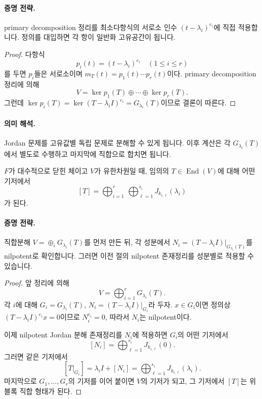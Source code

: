 \paragraph{증명 전략.}
primary decomposition 정리를 최소다항식의 서로소 인수 $(t-\lambda_i)^{e_i}$에 직접 적용합니다. 정의를 대입하면 각 항이 일반화 고유공간이 됩니다.

\begin{proof}
다항식
$$
p_i(t)=(t-\lambda_i)^{e_i}\quad(1\le i\le r)
$$
를 두면 $p_i$들은 서로소이며 $m_T(t)=p_1(t)\cdots p_r(t)$이다. primary decomposition 정리에 의해
$$
V=\ker p_1(T)\oplus\cdots\oplus\ker p_r(T).
$$
그런데 $\ker p_i(T)=\ker (T-\lambda_i I)^{e_i}=G_{\lambda_i}(T)$이므로 결론이 따른다.
\end{proof}

\paragraph{의미 해석.}
Jordan 문제를 고유값별 독립 문제로 분해할 수 있게 됩니다. 이후 계산은 각 $G_{\lambda_i}(T)$에서 별도로 수행하고 마지막에 직합으로 합치면 됩니다.

\begin{theorem}
$F$가 대수적으로 닫힌 체이고 $V$가 유한차원일 때, 임의의 $T\in\operatorname{End}(V)$에 대해 어떤 기저에서
$$
[T]=\bigoplus_{i=1}^r\ \bigoplus_{\ell=1}^{s_i} J_{k_{i,\ell}}(\lambda_i)
$$
가 된다.
\end{theorem}

\paragraph{증명 전략.}
직합분해 $V=\oplus_i G_{\lambda_i}(T)$를 먼저 만든 뒤, 각 성분에서 $N_i=(T-\lambda_i I)|_{G_{\lambda_i}(T)}$를 nilpotent로 확인합니다. 그러면 이전 절의 nilpotent 존재정리를 성분별로 적용할 수 있습니다.

\begin{proof}
앞 정리에 의해
$$
V=\bigoplus_{i=1}^r G_{\lambda_i}(T).
$$
각 $i$에 대해 $G_i=G_{\lambda_i}(T)$, $N_i=(T-\lambda_i I)|_{G_i}$라 두자. $x\in G_i$이면 정의상 $(T-\lambda_i I)^{e_i}x=0$이므로 $N_i^{e_i}=0$, 따라서 $N_i$는 nilpotent이다.

이제 nilpotent Jordan 분해 존재정리를 $N_i$에 적용하면 $G_i$의 어떤 기저에서
$$
[N_i]=\bigoplus_{\ell=1}^{s_i} J_{k_{i,\ell}}(0).
$$
그러면 같은 기저에서
$$
[T|_{G_i}]=\lambda_i I+[N_i]
=\bigoplus_{\ell=1}^{s_i} J_{k_{i,\ell}}(\lambda_i).
$$
마지막으로 $G_1,\dots,G_r$의 기저를 이어 붙이면 $V$의 기저가 되고, 그 기저에서 $[T]$는 위 블록 직합 형태가 된다.
\end{proof}

